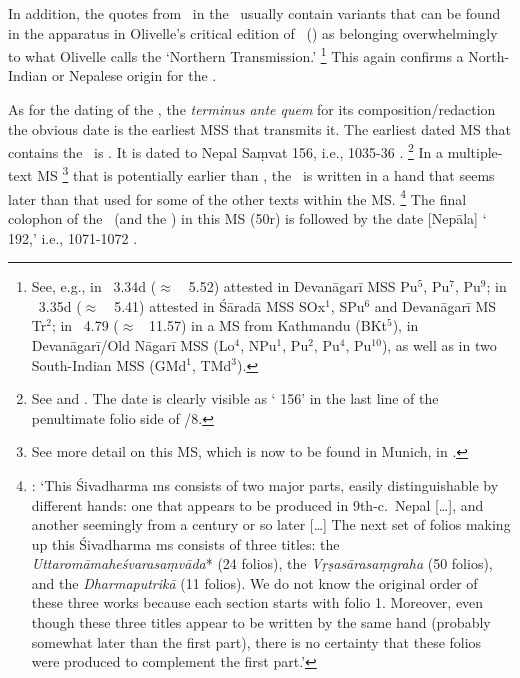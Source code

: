 In addition, the quotes from \Manu\ in the \VSS\
usually contain variants that can be found in the apparatus
in Olivelle's critical edition of \Manu\ (\citeyear{OlivelleManu})
as belonging overwhelmingly to
what Olivelle calls the `Northern Transmission.'%
		\footnote{See, e.g.,  in \VSS\ 3.34d 
		(${\approx}$\ \Manu\ 5.52) attested in
		Devanāgarī MSS Pu$^{5}$, Pu$^{7}$, Pu$^{9}$;
				 in \VSS\ 3.35d 
				(${\approx}$\ \Manu\ 5.41) attested in
			Śāradā MSS {\tiny S}Ox$^{1}$, {\tiny S}Pu$^{6}$ and 
			Devanāgarī MS Tr$^{2}$;
			 in \VSS\ 4.79 (${\approx}$ \Manu\ 11.57) in
			a MS from Kathmandu ({\tiny B}Kt$^5$), 
			in Devanāgarī/Old Nāgarī MSS
			(Lo$^{4}$, {\tiny N}Pu$^{1}$, Pu$^{2}$, Pu$^{4}$, Pu$^{10}$),
			as well as in two South-Indian MSS ({\tiny G}Md$^1$, 
			{\tiny T}Md$^3$).}
This again confirms a North-Indian or Nepalese
origin for the \VSS.

\medskip
As for the dating of the \VSS,
the \textit{terminus ante quem} for its
composition\thinspace /\thinspace redaction
the obvious date is the earliest MSS that transmits it.
The earliest dated MS that contains the \VSS\ is \msKoa. 
It is dated to Nepal Saṃvat 156, i.e., 1035-36 \CE.%
	\footnote{See  and
		. The date
	 	is clearly visible as ` 156' 
	 	in the last line of the penultimate folio side 
	 	of \msKoa/8.}
In a multiple-text MS%
	\footnote{See more detail on this MS, which is
						now to be found in Munich, in	
					    .}
that is potentially earlier than \msKoa,
the \VSS\ is written in a hand that seems later than
that used for some of the other texts within the MS.%
		\footnote{:
		`This Śivadharma ms consists 
		of two major parts, easily distinguishable by different 		
		hands: one that appears to be produced in
		9th-c.\ Nepal [\dots], and another seemingly from 
		a century or so later [\dots] 
		The next set of folios making up this Śivadharma ms 	
		consists of three titles: the 
		\textit{Uttaromāmaheśvarasaṃvāda}* (24 folios), 
		the \textit{Vṛṣasārasaṃgraha} (50 folios), and the
		\textit{Dharmaputrikā} (11 folios). We do
		not know the original order of these three works 
		because each section starts with folio 1. Moreover, even 
		though these three titles appear to be written by the same 
		hand (probably somewhat later than the ﬁrst part), there 
		is no certainty that these folios were produced to 	
		complement the ﬁrst part.'}
The final colophon of the \VSS\ (and the \DHARMP) in
this MS  (\fol50r) is followed by the date
[Nepāla] ` 192,' i.e., 1071-1072 \CE.

